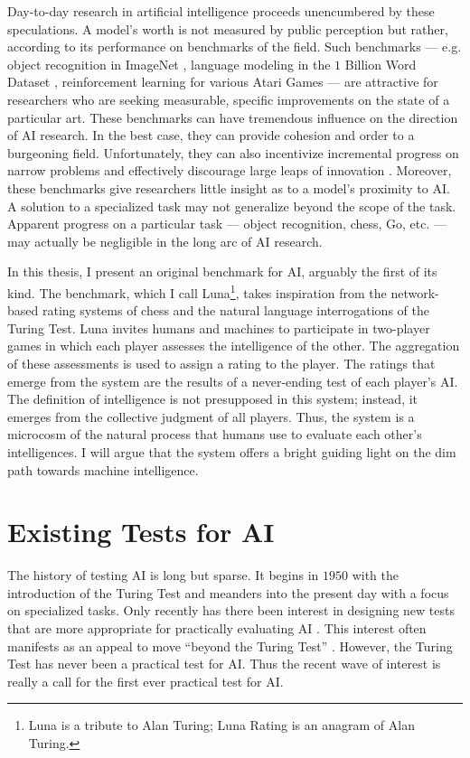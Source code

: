Day-to-day research in artificial intelligence proceeds unencumbered by these speculations. A model's worth is not measured by public perception but rather, according to its performance on benchmarks of the field. Such benchmarks --- e.g. object recognition in ImageNet \citep{russakovsky2015imagenet}, language modeling in the $1$ Billion Word Dataset \citep{chelba2013one}, reinforcement learning for various Atari Games \citep{mnih2013playing} --- are attractive for researchers who are seeking measurable, specific improvements on the state of a particular art. These benchmarks can have tremendous influence on the direction of AI research. In the best case, they can provide cohesion and order to a burgeoning field. Unfortunately, they can also incentivize incremental progress on narrow problems and effectively discourage large leaps of innovation \citep{shieber2015}. Moreover, these benchmarks give researchers little insight as to a model's proximity to AI. A solution to a specialized task may not generalize beyond the scope of the task. Apparent progress on a particular task --- object recognition, chess, Go, etc. --- may actually be negligible in the long arc of AI research.

In this thesis, I present an original benchmark for AI, arguably the first of its kind. The benchmark, which I call Luna\footnote{Luna is a tribute to Alan Turing; Luna Rating is an anagram of Alan Turing.}, takes inspiration from the network-based rating systems of chess and the natural language interrogations of the Turing Test. Luna invites humans and machines to participate in two-player games in which each player assesses the intelligence of the other. The aggregation of these assessments is used to assign a rating to the player. The ratings that emerge from the system are the results of a never-ending test of each player's AI. The definition of intelligence is not presupposed in this system; instead, it emerges from the collective judgment of all players. Thus, the system is a microcosm of the natural process that humans use to evaluate each other's intelligences. I will argue that the system offers a bright guiding light on the dim path towards machine intelligence.

\section{Existing Tests for AI}

The history of testing AI is long but sparse. It begins in $1950$ with the introduction of the Turing Test and meanders into the present day with a focus on specialized tasks. Only recently has there been interest in designing new tests that are more appropriate for practically evaluating AI \citep{you2015beyond}. This interest often manifests as an appeal to move ``beyond the Turing Test'' \citep{1_the_newyorker_2015}. However, the Turing Test has never been a practical test for AI. Thus the recent wave of interest is really a call for the first ever practical test for AI.

